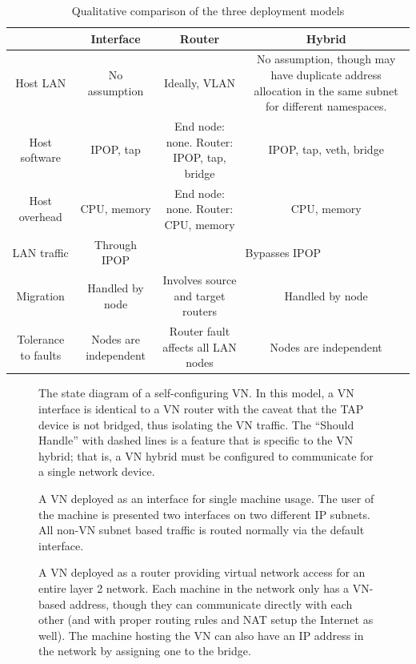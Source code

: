 \begin{table}[ht]
\centering
\begin{tabular*}{0.75\textwidth}{|c||c|c|c|} \hline
 & Interface & Router & Hybrid \\ \hline\hline
Host LAN 
& 
No assumption 
& 
Ideally, VLAN
&
No assumption, though may have duplicate address allocation in the same subnet
for different namespaces.\footnotemark[2]
\\ \hline
Host software
&
IPOP, tap
&
End node: none. Router: IPOP, tap, bridge 
&
IPOP, tap, veth, bridge \\ \hline
Host overhead
&
CPU, memory
& 
End node: none. Router: CPU, memory
&
CPU, memory \\ \hline
LAN traffic
&
Through IPOP
&
\multicolumn{2}{c|}{Bypasses IPOP} \\ \hline
Migration
&
Handled by node
&
Involves source and target routers
&
Handled by node \\ \hline
Tolerance to faults
&
Nodes are independent
&
Router fault affects all LAN nodes
&
Nodes are independent \\ \hline
\end{tabular*}
\caption{Qualitative comparison of the three deployment models}
\label{tab:three_models}
\end{table}

\begin{figure}[ht]
\centering
{}
\caption[The state diagram of a self-configuring VN.]{The state diagram of a
self-configuring VN.  In this model, a VN interface is identical to a VN router
with the caveat that the TAP device is not bridged, thus isolating the VN
traffic.  The ``Should Handle'' with dashed lines is a feature that is specific
to the VN hybrid; that is, a VN hybrid must be configured to communicate for a
single network device.}
\label{fig:vn}
\end{figure}

\begin{figure}[ht]
\centering
{}
\caption[VN Interface]{A VN deployed as an interface for single machine usage.
The user of the machine is presented two interfaces on two different IP subnets.
All non-VN subnet based traffic is routed normally via the default interface.}
\label{fig:interface}
\end{figure}

\begin{figure}[ht]
\centering
{}
\caption[VN Router]{A VN deployed as a router providing virtual network access
for an entire layer 2 network.  Each machine in the network only has a VN-based
address, though they can communicate directly with each other (and with proper
routing rules and NAT setup the Internet as well).  The machine hosting the VN
can also have an IP address in the network by assigning one to the bridge.}
\label{fig:router}
\end{figure}

